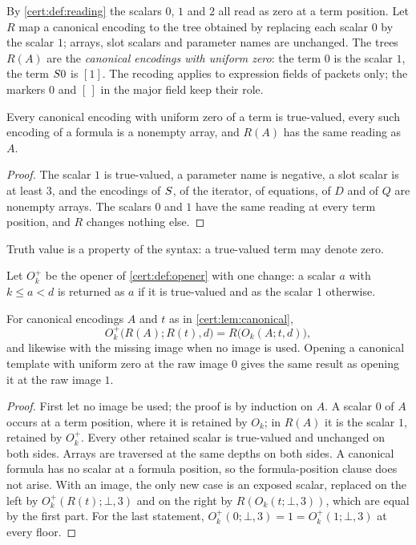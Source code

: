 By \cref{cert:def:reading} the scalars $0$, $1$ and $2$ all read as zero at a
term position. Let $R$ map a canonical encoding to the tree obtained by
replacing each scalar $0$ by the scalar $1$; arrays, slot scalars and
parameter names are unchanged. The trees $R(A)$ are the \emph{canonical
encodings with uniform zero}: the term $0$ is the scalar $1$, the term
$S 0$ is $[1]$. The recoding applies to expression fields of packets only;
the markers $0$ and $[\,]$ in the major field keep their role.

\begin{lemma}\label{cert:lem:truthy}
Every canonical encoding with uniform zero of a term is true-valued, every
such encoding of a formula is a nonempty array, and $R(A)$ has the same
reading as $A$.
\end{lemma}
\begin{proof}
The scalar $1$ is true-valued, a parameter name is negative, a slot scalar is
at least $3$, and the encodings of $S$, of the iterator, of equations, of
$D$ and of $Q$ are nonempty arrays. The scalars $0$ and $1$ have the
same reading at every term position, and $R$ changes nothing else.
\end{proof}

Truth value is a property of the syntax: a true-valued term may denote zero.

Let $O^{+}_k$ be the opener of \cref{cert:def:opener} with one change: a scalar
$a$ with $k\le a<d$ is returned as $a$ if it is true-valued and as the scalar
$1$ otherwise.

\begin{lemma}\label{cert:lem:recoding}
For canonical encodings $A$ and $t$ as in \cref{cert:lem:canonical},
\[
O^{+}_k\bigl(R(A);R(t),d\bigr)=R\bigl(O_k(A;t,d)\bigr),
\]
and likewise with the missing image when no image is used. Opening a
canonical template with uniform zero at the raw image $0$ gives the same
result as opening it at the raw image $1$.
\end{lemma}
\begin{proof}
First let no image be used; the proof is by induction on $A$. A scalar $0$ of
$A$ occurs at a term position, where it is retained by $O_k$; in $R(A)$ it is
the scalar $1$, retained by $O^{+}_k$. Every other retained scalar is
true-valued and unchanged on both sides. Arrays are traversed at the same
depths on both sides. A canonical formula has no scalar at a formula position,
so the formula-position clause does not arise. With an image, the only new
case is an exposed scalar, replaced on the left by $O^{+}_k(R(t);\bot,3)$ and
on the right by $R(O_k(t;\bot,3))$, which are equal by the first part. For the
last statement, $O^{+}_k(0;\bot,3)=1=O^{+}_k(1;\bot,3)$ at every floor.
\end{proof}

